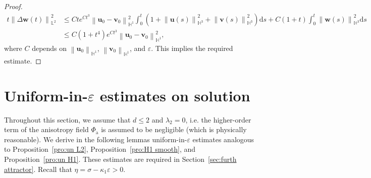 \documentclass[11pt, reqno]{amsart}
\theoremstyle{definition}
\numberwithin{equation}{section}
\newcommand{\bff}{\boldsymbol}
\newcommand{\bb}{\mathbb}
\newcommand{\ds}{\mathrm{d}s}
\newcommand{\norm}[2]{\left\|{#1}\right\|_{#2}}
\begin{document}
\begin{proof}
\begin{align*}
    t \norm{\Delta \bff{w}(t)}{\bb{L}^2}^2
    &\leq
    Cte^{Ct^3} \norm{\bff{u}_0-\bff{v}_0}{\bb{H}^1}^2 \int_0^t \left(1+\norm{\bff{u}(s)}{\bb{H}^3}^2  + \norm{\bff{v}(s)}{\bb{H}^3}^2 \right) \ds 
    + 
    C(1+t) \int_0^t \norm{\bff{w}(s)}{\bb{H}^3}^2 \ds
    \\
    &\leq
    C(1+t^4)e^{Ct^3} \norm{\bff{u}_0-\bff{v}_0}{\bb{H}^1}^2,
\end{align*}
where $C$ depends on $\norm{\bff{u}_0}{\bb{H}^1}$, $\norm{\bff{v}_0}{\bb{H}^1}$, and $\varepsilon$.
This implies the required estimate.
\end{proof}


\section{Uniform-in-$\varepsilon$ estimates on solution}\label{sec:uniform in e}


Throughout this section, we assume that $d\leq 2$ and $\lambda_2=0$, i.e. the higher-order term of the anisotropy field $\Phi_{\mathrm{a}}$ is assumed to be negligible (which is physically reasonable).
We derive in the following lemmas uniform-in-$\varepsilon$ estimates analogous to Proposition~\ref{pro:un L2}, Proposition~\ref{pro:H1 smooth}, and Proposition~\ref{pro:un H1}. These estimates are required in Section~\ref{sec:furth attractor}. Recall that $\eta= \sigma-\kappa_1 \varepsilon>0$.
\end{document}
